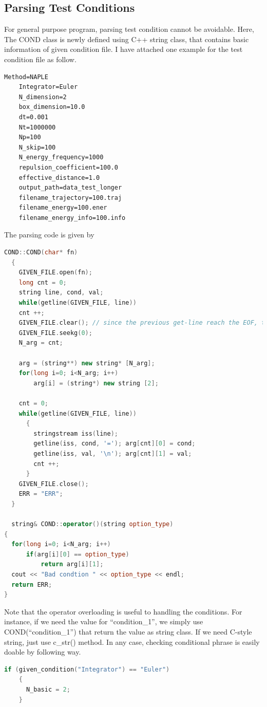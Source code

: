 \message{ !name(brief_Brownian_dynamics.tex)}\documentclass[10pt, a4paper]{report}
\begin{document}
\begin{appendices}
  \section{Parsing Test Conditions}
  For general purpose program, parsing test condition cannot be avoidable. Here, The COND class is newly defined using C++ string class, that contains basic information of given condition file. I have attached one example for the test condition file as follow.
  \begin{lstlisting}[frame=single]
    Method=NAPLE
    Integrator=Euler
    N_dimension=2
    box_dimension=10.0
    dt=0.001
    Nt=1000000
    Np=100
    N_skip=100
    N_energy_frequency=1000
    repulsion_coefficient=100.0
    effective_distance=1.0
    output_path=data_test_longer
    filename_trajectory=100.traj
    filename_energy=100.ener
    filename_energy_info=100.info
  \end{lstlisting}

  The parsing code is given by
  \begin{lstlisting}[language=C++, frame=single]
COND::COND(char* fn)
  {
    GIVEN_FILE.open(fn);
    long cnt = 0;
    string line, cond, val;
    while(getline(GIVEN_FILE, line))
    cnt ++;
    GIVEN_FILE.clear(); // since the previous get-line reach the EOF, this is bad-status. So, it need clear to use file object.
    GIVEN_FILE.seekg(0);
    N_arg = cnt; 

    arg = (string**) new string* [N_arg];
    for(long i=0; i<N_arg; i++)
        arg[i] = (string*) new string [2];

    cnt = 0;
    while(getline(GIVEN_FILE, line))
      {
        stringstream iss(line);
        getline(iss, cond, '='); arg[cnt][0] = cond;
        getline(iss, val, '\n'); arg[cnt][1] = val;
        cnt ++;
      }
    GIVEN_FILE.close();
    ERR = "ERR";
  }

  string& COND::operator()(string option_type)
{
  for(long i=0; i<N_arg; i++)
      if(arg[i][0] == option_type)
          return arg[i][1];
  cout << "Bad condtion " << option_type << endl;
  return ERR;
}
  \end{lstlisting}

  Note that the operator overloading is useful to handling the conditions. For instance, if we need the value for ``condition{\_}1'', we simply use COND(``condition{\_}1'') that return the value as string class. If we need C-style string, just use c{\_}str() method. In any case, checking conditional phrase is easily doable by following way.
  \begin{lstlisting}[language=C++, frame=single]
    if (given_condition("Integrator") == "Euler")
    {
      N_basic = 2;
    }
  \end{lstlisting}
  

\end{appendices}
\end{document}
